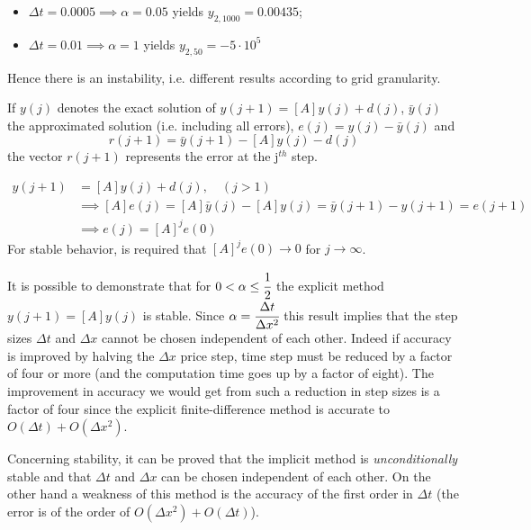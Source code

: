 \begin{itemize}
\item $\Delta t = 0.0005 \implies \alpha = 0.05$ yields $y_{2,1000}=0.00435$;
\item $\Delta t = 0.01 \implies \alpha = 1$ yields $y_{2,50}=-5\cdot 10^5$
\end{itemize}
Hence there is an instability, i.e. different results according to grid granularity.

If $y(j)$ denotes the exact solution of $y(j+1) = [A] y(j) + d(j)$, $\bar{y}(j)$ the approximated solution (i.e. including all errors), $e(j) = y(j)-\bar{y}(j)$ and
\begin{equation}
r(j+1) = \bar{y}(j+1)-[A]y(j)-d(j)
\end{equation}
\noindent
the vector $r(j+1)$ represents the error at the j$^{th}$ step. %

\begin{equation}
\begin{split}
y(j+1) &= [A]y(j) + d(j),\quad (j > 1) \\
&\implies [A]e(j) = [A]\bar{y}(j) - [A]y(j) = \bar{y}(j+1) - y(j+1) = e(j+1) \\
&\implies e(j) = [A]^j e(0)
\end{split}
\end{equation}
For stable behavior, is required that $[A]^j e(0) \rightarrow 0$ for $j\rightarrow\infty$.

It is possible to demonstrate that for $0< \alpha\leq\cfrac{1}{2}$ the explicit method $y(j+1) = [A]y(j)$ is stable.
Since $\alpha=\cfrac{\Delta t}{\Delta x^2}$ this result implies that the step sizes $\Delta t$ and $\Delta x$  cannot be chosen independent of each other.
Indeed if accuracy is improved by halving the $\Delta x$ price step, time step must be reduced by a factor of four or more (and the computation time goes up by a factor of eight). The improvement in accuracy we would get from such a reduction in step sizes is a factor of four since the explicit finite-difference method is accurate to $O(\Delta t) + O(\Delta x^2)$.

Concerning stability, it can be proved that the implicit method is \emph{unconditionally} stable and that $\Delta t$ and $\Delta x$ can be chosen independent of each other.
On the other hand a weakness of this method is the accuracy of the first order in $\Delta t$ (the error is of the order of $O(\Delta x^2) + O(\Delta t)$). 

